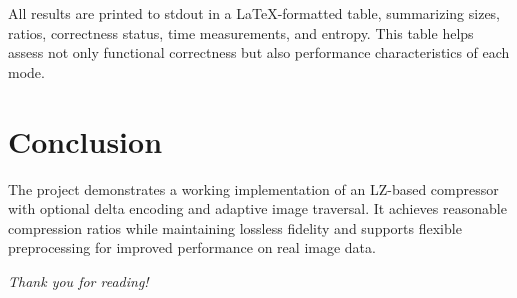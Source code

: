 \documentclass[a4paper,12pt]{article}
\begin{document}
    All results are printed to stdout in a LaTeX-formatted table, summarizing sizes, ratios, correctness status, time
    measurements, and entropy. This table helps assess not only functional correctness but also performance
    characteristics of each mode.


    \section{Conclusion}
    The project demonstrates a working implementation of an LZ-based compressor with optional delta encoding and adaptive image traversal. It achieves reasonable compression ratios while maintaining lossless fidelity and supports flexible preprocessing for improved performance on real image data.

    \vfill
    \begin{center}
        \textit{Thank you for reading!}
    \end{center}
\end{document}
